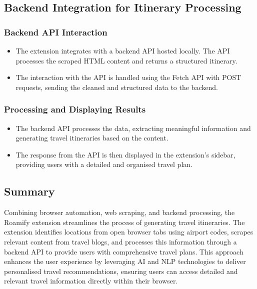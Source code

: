 \documentclass[conference]{IEEEtran}
\begin{document}
    \subsection{Backend Integration for Itinerary Processing}

        \subsubsection{Backend API Interaction}
            \begin{itemize}
                \item The extension integrates with a backend API hosted locally. The API processes the scraped HTML content and returns a structured itinerary.
                \item The interaction with the API is handled using the Fetch API with POST requests, sending the cleaned and structured data to the backend.
            \end{itemize}

        \subsubsection{Processing and Displaying Results}
            \begin{itemize}
                \item The backend API processes the data, extracting meaningful information and generating travel itineraries based on the content.
                \item The response from the API is then displayed in the extension’s sidebar, providing users with a detailed and organised travel plan.
            \end{itemize}

    \subsection{Summary}
        Combining browser automation, web scraping, and backend processing, the Roamify extension streamlines the process of generating travel itineraries. The extension identifies locations from open browser tabs using airport codes, scrapes relevant content from travel blogs, and processes this information through a backend API to provide users with comprehensive travel plans. This approach enhances the user experience by leveraging AI and NLP technologies to deliver personalised travel recommendations, ensuring users can access detailed and relevant travel information directly within their browser.
\end{document}
